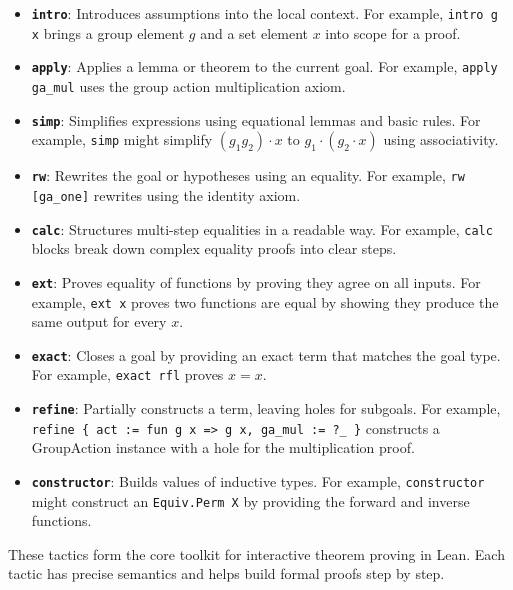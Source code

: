 \documentclass[
  12pt, %
]{assignment}
\begin{document}
\begin{itemize}
	\item \textbf{\texttt{intro}}: Introduces assumptions into the local context. For example, \texttt{intro g x} brings a group element $g$ and a set element $x$ into scope for a proof.

	\item \textbf{\texttt{apply}}: Applies a lemma or theorem to the current goal. For example, \texttt{apply ga\_mul} uses the group action multiplication axiom.

	\item \textbf{\texttt{simp}}: Simplifies expressions using equational lemmas and basic rules. For example, \texttt{simp} might simplify $(g_1 g_2) \cdot x$ to $g_1 \cdot (g_2 \cdot x)$ using associativity.

	\item \textbf{\texttt{rw}}: Rewrites the goal or hypotheses using an equality. For example, \texttt{rw [ga\_one]} rewrites using the identity axiom.

	\item \textbf{\texttt{calc}}: Structures multi-step equalities in a readable way. For example, \texttt{calc} blocks break down complex equality proofs into clear steps.

	\item \textbf{\texttt{ext}}: Proves equality of functions by proving they agree on all inputs. For example, \texttt{ext x} proves two functions are equal by showing they produce the same output for every $x$.

	\item \textbf{\texttt{exact}}: Closes a goal by providing an exact term that matches the goal type. For example, \texttt{exact rfl} proves $x = x$.

	\item \textbf{\texttt{refine}}: Partially constructs a term, leaving holes for subgoals. For example, \texttt{refine \{ act := fun g x => g x, ga\_mul := ?\_ \}} constructs a GroupAction instance with a hole for the multiplication proof.

	\item \textbf{\texttt{constructor}}: Builds values of inductive types. For example, \texttt{constructor} might construct an \texttt{Equiv.Perm X} by providing the forward and inverse functions.
\end{itemize}

These tactics form the core toolkit for interactive theorem proving in Lean. Each tactic has precise semantics and helps build formal proofs step by step.
\end{document}
